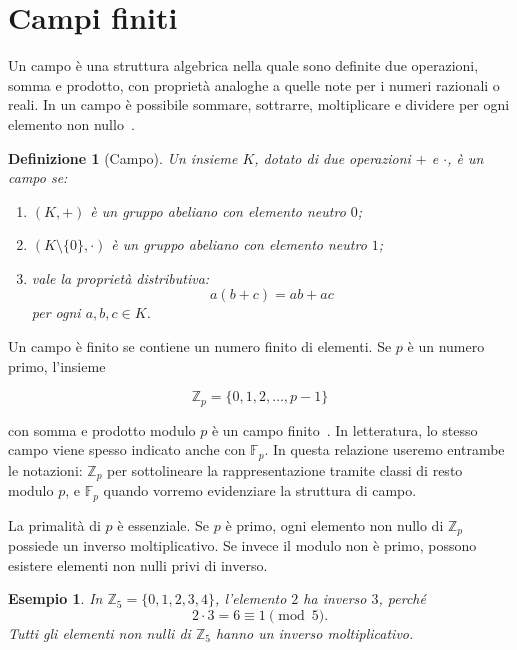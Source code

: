 \documentclass[12pt,a4paper,oneside]{report}
\newtheorem{definition}{Definizione}[chapter]
\newtheorem{example}{Esempio}[chapter]
\begin{document}
\section{Campi finiti}

Un campo è una struttura algebrica nella quale sono definite due operazioni, somma e prodotto, con proprietà analoghe a quelle note per i numeri razionali o reali. In un campo è possibile sommare, sottrarre, moltiplicare e dividere per ogni elemento non nullo~\cite{margara_ec}.

\begin{definition}[Campo]
Un insieme \(K\), dotato di due operazioni \(+\) e \(\cdot\), è un campo se:
\begin{enumerate}
    \item \((K,+)\) è un gruppo abeliano con elemento neutro \(0\);
    \item \((K \setminus \{0\},\cdot)\) è un gruppo abeliano con elemento neutro \(1\);
    \item vale la proprietà distributiva:
    \[
    a(b+c)=ab+ac
    \]
    per ogni \(a,b,c \in K\).
\end{enumerate}
\end{definition}

Un campo è finito se contiene un numero finito di elementi. Se \(p\) è un numero primo, l'insieme

\begin{equation}
    \mathbb{Z}_p = \{0,1,2,\ldots,p-1\}
\end{equation}

con somma e prodotto modulo \(p\) è un campo finito~\cite{margara_ec}. In letteratura, lo stesso campo viene spesso indicato anche con \(\mathbb{F}_p\). In questa relazione useremo entrambe le notazioni: \(\mathbb{Z}_p\) per sottolineare la rappresentazione tramite classi di resto modulo \(p\), e \(\mathbb{F}_p\) quando vorremo evidenziare la struttura di campo.

La primalità di \(p\) è essenziale. Se \(p\) è primo, ogni elemento non nullo di \(\mathbb{Z}_p\) possiede un inverso moltiplicativo. Se invece il modulo non è primo, possono esistere elementi non nulli privi di inverso.

\begin{example}
In \(\mathbb{Z}_5 = \{0,1,2,3,4\}\), l'elemento \(2\) ha inverso \(3\), perché
\[
2 \cdot 3 = 6 \equiv 1 \pmod 5.
\]
Tutti gli elementi non nulli di \(\mathbb{Z}_5\) hanno un inverso moltiplicativo.
\end{example}
\end{document}
